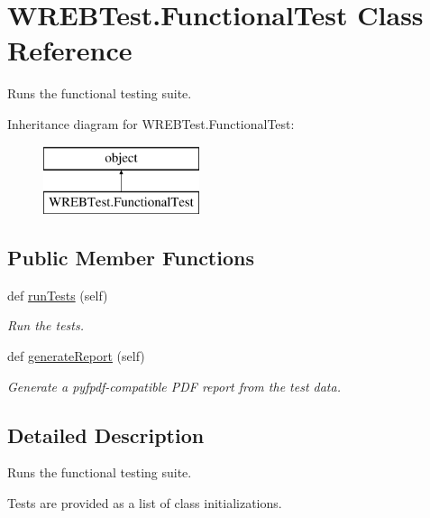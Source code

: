 \hypertarget{class_w_r_e_b_test_1_1_functional_test}{}\section{W\+R\+E\+B\+Test.\+Functional\+Test Class Reference}
\label{class_w_r_e_b_test_1_1_functional_test}


Runs the functional testing suite.  


Inheritance diagram for W\+R\+E\+B\+Test.\+Functional\+Test\+:\begin{figure}[H]
\begin{center}
\leavevmode
\includegraphics[height=2.000000cm]{class_w_r_e_b_test_1_1_functional_test}
\end{center}
\end{figure}
\subsection*{Public Member Functions}
\begin{DoxyCompactItemize}
\item 
def \hyperlink{class_w_r_e_b_test_1_1_functional_test_abc3fbd2a8e90988cb62731653df94cdf}{run\+Tests} (self)
\begin{DoxyCompactList}\small\item\em Run the tests. \end{DoxyCompactList}\item 
def \hyperlink{class_w_r_e_b_test_1_1_functional_test_a9b9f48ba6a45e7b47417bb3b39cfdaef}{generate\+Report} (self)
\begin{DoxyCompactList}\small\item\em Generate a pyfpdf-\/compatible P\+DF report from the test data. \end{DoxyCompactList}\end{DoxyCompactItemize}


\subsection{Detailed Description}
Runs the functional testing suite. 

Tests are provided as a list of class initializations. 

